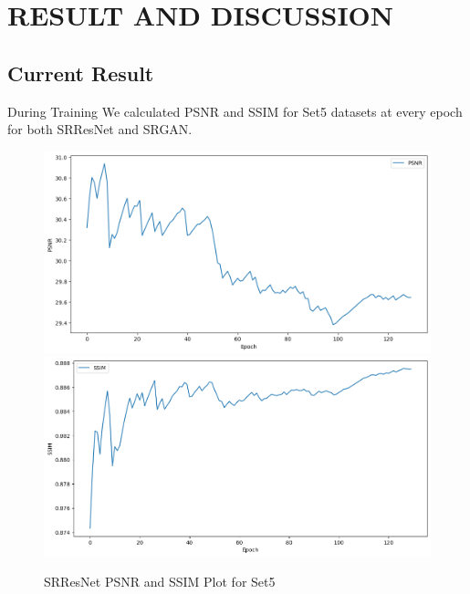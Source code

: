 \newpage
\section{RESULT AND DISCUSSION}
\subsection{Current Result}
During Training We calculated PSNR and SSIM for Set5 datasets at every epoch for both SRResNet and SRGAN.
\begin{figure}[h]
    \centering
    \includegraphics[width=5.5in]{./figures/srresnet_psnr.png}
    \includegraphics[width=5.5in]{./figures/srresnnet_ssim.png}
    \caption{SRResNet PSNR and SSIM Plot for Set5}
\end{figure}  
